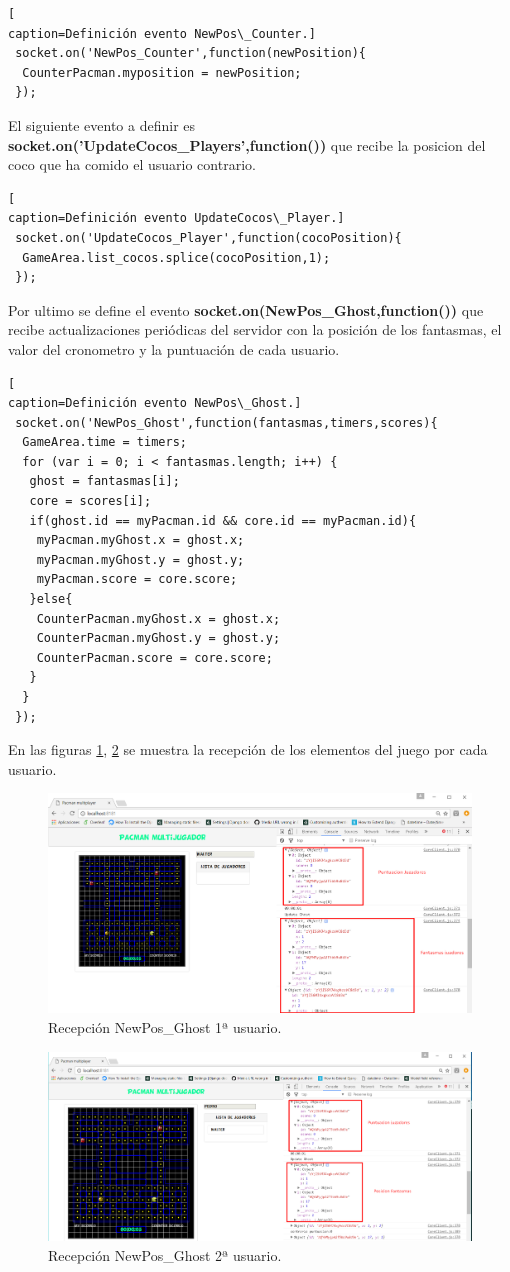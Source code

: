 \begin{lstlisting}[
caption=Definición evento NewPos\_Counter.]
 socket.on('NewPos_Counter',function(newPosition){
  CounterPacman.myposition = newPosition;
 });
\end{lstlisting}
El siguiente evento a definir es \textbf{socket.on('UpdateCocos\_Players',function())} que recibe la posicion del coco que ha comido el usuario contrario.
\begin{lstlisting}[
caption=Definición evento UpdateCocos\_Player.]
 socket.on('UpdateCocos_Player',function(cocoPosition){
  GameArea.list_cocos.splice(cocoPosition,1);
 });
\end{lstlisting}
Por ultimo se define el evento \textbf{socket.on(NewPos\_Ghost,function())} que recibe actualizaciones periódicas del servidor con la posición de los fantasmas, el valor del cronometro y la puntuación de cada usuario.
\begin{lstlisting}[
caption=Definición evento NewPos\_Ghost.]
 socket.on('NewPos_Ghost',function(fantasmas,timers,scores){
  GameArea.time = timers;
  for (var i = 0; i < fantasmas.length; i++) {
   ghost = fantasmas[i];
   core = scores[i];
   if(ghost.id == myPacman.id && core.id == myPacman.id){
    myPacman.myGhost.x = ghost.x;
    myPacman.myGhost.y = ghost.y;
    myPacman.score = core.score;			
   }else{
    CounterPacman.myGhost.x = ghost.x;
    CounterPacman.myGhost.y = ghost.y;
    CounterPacman.score = core.score;
   }
  }
 });
\end{lstlisting}
En las figuras \ref{fig:Update_Ghots_1}, \ref{fig:Update_Ghots_2} se muestra la recepción de los elementos del juego por cada usuario.
\begin{figure}[!h]
\begin{center}
   \includegraphics[width=0.6\linewidth]{Figures/Update_Ghots_1}
	\decoRule
	\caption[Recepción NewPos\_Ghost 1ª usuario.]{Recepción NewPos\_Ghost 1ª usuario.}
\label{fig:Update_Ghots_1}
\end{center}
\end{figure}
\begin{figure}[!h]
\begin{center}
   \includegraphics[width=0.6\linewidth]{Figures/Update_Ghots_2}
	\decoRule
	\caption[Recepción NewPos\_Ghost 2ª usuario.]{Recepción NewPos\_Ghost 2ª usuario.}
\label{fig:Update_Ghots_2}
\end{center}
\end{figure}
